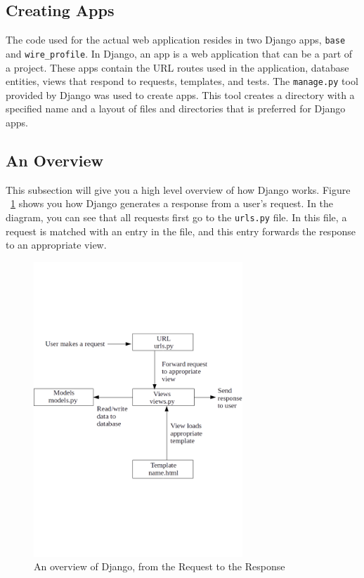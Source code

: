\subsection{Creating Apps}

The code used for the actual web application resides in two Django apps, \texttt{base} and
\texttt{wire\_profile}. In Django, an app is a web application that can be a part of a project.
These apps contain the URL routes used in the application, database entities, views
that respond to requests, templates, and tests. The \texttt{manage.py} tool provided
by Django was used to create apps. This tool creates a directory with a specified name
and a layout of files and directories that is preferred for Django apps. \parencite{djangoIntroDocs}

\subsection{An Overview}

This subsection will give you a high level overview of how Django works. 
Figure ~\ref{fig:djangoOverview} shows you how Django generates a response
from a user's request. In the diagram, you can see that all requests first
go to the \texttt{urls.py} file. In this file, a request is matched with
an entry in the file, and this entry forwards the response to an appropriate
view.

\begin{figure}[H]
	\centering
	\includegraphics[width=0.7\textwidth]{final_report/pics/django_diagram.png}
	\caption{An overview of Django, from the Request to the Response}
	\label{fig:djangoOverview}
\end{figure}

